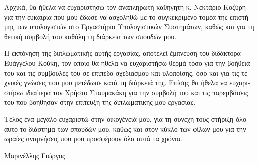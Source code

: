 \begin{greek}
\begin{acknowledgements}

Αρχικά, θα ήθελα να ευχαριστήσω τον αναπληρωτή καθηγητή κ. Νεκτάριο Κοζύρη για
την ευκαιρία που μου έδωσε να ασχοληθώ με το συγκεκριμένο τομέα της επιστήμης
των υπολογιστών στο Εργαστήριο Υπολογιστικών Συστημάτων, καθώς και για τη θετική
συμβολή του καθόλη τη διάρκεια των σπουδών μου.

Η εκπόνηση της διπλωματικής αυτής εργασίας, αποτελεί έμπνευση του διδάκτορα
Ευάγγελου Κούκη, τον οποίο θα ήθελα να ευχαριστήσω θερμά τόσο για την βοήθειά
του και τις συμβουλές του σε επίπεδο σχεδιασμού και υλοποίσης, όσο και για τις
τεχνικές γνώσεις που μου μετέδωσε κατά τη διάρκειά της. Επίσης θα ήθελα να
ευχαριστήσω ιδιαίτερα τον Χρήστο Σταυρακάκη για την συμβολή του και τις
παρεμβάσεις του που βοήθησαν στην επίτευξη της διπλωματικής μου εργασίας.

Τέλος ένα μεγάλο ευχαριστώ στην οικογένειά μου, για τη συνεχή τους στήριξη όλο
αυτό το διάστημα των σπουδών μου, καθώς και στον κύκλο των φίλων μου για την
ωραίες αναμνήσεις που μου προσφέρουν όλα αυτά τα χρόνια.

\begin{flushright}Μαρινέλλης Γιώργος\end{flushright}

\end{acknowledgements}
\end{greek}
